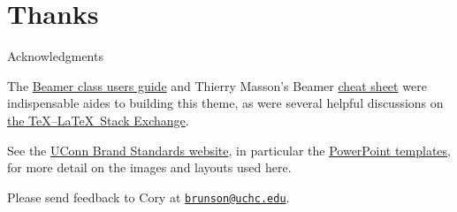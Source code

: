 \documentclass{beamer}
\begin{document}
\section{Thanks}


\begin{frame}{Acknowledgments}

The \href{http://tug.ctan.org/macros/latex/contrib/beamer/doc/beameruserguide.pdf}{Beamer class users guide} and Thierry Masson's Beamer \href{http://www.cpt.univ-mrs.fr/~masson/latex/Beamer-appearance-cheat-sheet.pdf}{cheat sheet} were indispensable aides to building this theme, as were several helpful discussions on \href{https://tex.stackexchange.com/}{the \TeX--\LaTeX\ Stack Exchange}.

See the \href{http://brand.uconn.edu/}{UConn Brand Standards website}, in particular the \href{http://brand.uconn.edu/resources/powerpoint-templates/}{PowerPoint templates}, for more detail on the images and layouts used here.

Please send feedback to Cory at \href{mailto:brunson@uchc.edu}{\tt brunson@uchc.edu}.

\end{frame}
\end{document}
